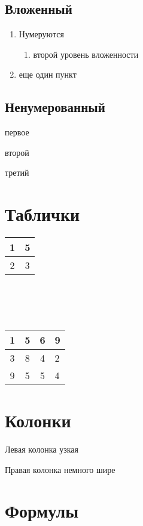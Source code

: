 \documentclass[12pt]{article}
\begin{document}
\subsection{Вложенный}
\begin{enumerate}
\item Нумеруются
\begin{enumerate}
\item второй уровень вложенности
\end{enumerate}
\item еще один пункт
\end{enumerate}

\subsection{Ненумерованный}
\begin{trivlist}
\item первое
\item второй
\item третий
\end{trivlist}
\newpage

\section{Таблички}
\begin{tabular}{|c|c||}
1 & 5 \\
\hline
2 & 3
\end{tabular}
\\
\\
\\
\begin{tabular}{|c|c|c|p{6cm}|}
\hline
1 & 5 & 6 & 9 \\
\hline
3 & 8 & 4 & 2 \\
\hline
9 & 5 & 5 & 4\\
\hline
\end{tabular}
\newpage

\section{Колонки}
\begin{minipage}[t]{14mm}
Левая колонка узкая
\end{minipage}
\hfill
\begin{minipage}[t]{38mm}
Правая колонка немного шире
\end{minipage}
\newpage

\section{Формулы} %
\end{document}
